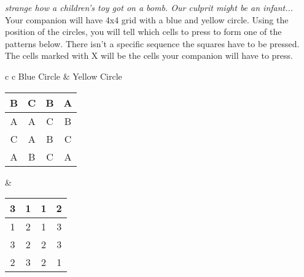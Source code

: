 \documentclass[letterpaper,12pt]{report}
\begin{document}
\textit{strange how a children's toy got on a bomb. Our culprit might be an infant...}\\[1cm]
Your companion will have 4x4 grid with a blue and yellow circle. Using the position of the circles,
you will tell which cells to press to form one of the patterns below.
There isn't a specific sequence the squares have to be pressed.
The cells marked with X will be the cells your companion will have to press.
\renewcommand{\arraystretch}{1.2}
\begin{center}
  \begin{tabular}{c c}
    Blue Circle & Yellow Circle \\
    \begin{tabular}{|c|c|c|c|}
      \hline
      B & C & B & A \\\hline
      A & A & C & B \\\hline
      C & A & B & C \\\hline
      A & B & C & A \\\hline
    \end{tabular}
                &
    \begin{tabular}{|c|c|c|c|}
      \hline
      3 & 1 & 1 & 2 \\\hline
      1 & 2 & 1 & 3 \\\hline
      3 & 2 & 2 & 3 \\\hline
      2 & 3 & 2 & 1 \\\hline
    \end{tabular}
  \end{tabular}
\end{center}
\end{document}
